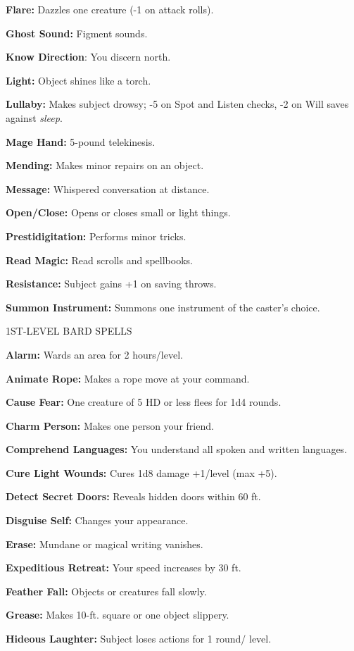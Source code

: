 \documentclass{article}
\begin{document}
\textbf{Flare:} Dazzles one creature (-1 on attack rolls).

\textbf{Ghost Sound:} Figment sounds.

\textbf{Know Direction}: You discern north.

\textbf{Light:} Object shines like a torch.

\textbf{Lullaby:} Makes subject drowsy; -5 on Spot and Listen checks, -2 on Will 
saves against \textit{sleep}.

\textbf{Mage Hand:} 5-pound telekinesis.

\textbf{Mending: }Makes minor repairs on an object.

\textbf{Message: }Whispered conversation at distance.

\textbf{Open/Close:} Opens or closes small or light things.

\textbf{Prestidigitation:} Performs minor tricks.

\textbf{Read Magic:} Read scrolls and spellbooks.

\textbf{Resistance:} Subject gains +1 on saving throws.

\textbf{Summon Instrument:} Summons one instrument of the caster's choice.

1ST-LEVEL BARD SPELLS

\textbf{Alarm:} Wards an area for 2 hours/level.

\textbf{Animate Rope:} Makes a rope move at your command.

\textbf{Cause Fear:} One creature of 5 HD or less flees for 1d4 rounds.

\textbf{Charm Person: }Makes one person your friend.

\textbf{Comprehend Languages:} You understand all spoken and written languages.

\textbf{Cure Light Wounds:} Cures 1d8 damage +1/level (max +5).

\textbf{Detect Secret Doors:} Reveals hidden doors within 60 ft.

\textbf{Disguise Self:} Changes your appearance.

\textbf{Erase: }Mundane or magical writing vanishes.

\textbf{Expeditious Retreat:} Your speed increases by 30 ft.

\textbf{Feather Fall:} Objects or creatures fall slowly.

\textbf{Grease:} Makes 10-ft. square or one object slippery.

\textbf{Hideous Laughter:} Subject loses actions for 1 round/ level.
\end{document}
